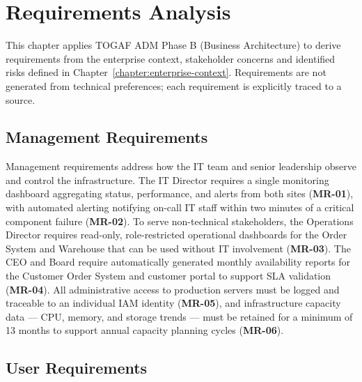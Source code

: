 \chapter{Requirements Analysis}
\label{chapter:requirements}

This chapter applies TOGAF ADM Phase B (Business Architecture) to derive requirements from the enterprise context, stakeholder concerns and identified risks defined in Chapter~\ref{chapter:enterprise-context}. Requirements are not generated from technical preferences; each requirement is explicitly traced to a source.

\section{Management Requirements}

\label{tab:req-mgmt}Management requirements address how the IT team and senior leadership observe and control the infrastructure. The IT Director requires a single monitoring dashboard aggregating status, performance, and alerts from both sites (\textbf{MR-01}), with automated alerting notifying on-call IT staff within two minutes of a critical component failure (\textbf{MR-02}). To serve non-technical stakeholders, the Operations Director requires read-only, role-restricted operational dashboards for the Order System and Warehouse that can be used without IT involvement (\textbf{MR-03}). The CEO and Board require automatically generated monthly availability reports for the Customer Order System and customer portal to support SLA validation (\textbf{MR-04}). All administrative access to production servers must be logged and traceable to an individual IAM identity (\textbf{MR-05}), and infrastructure capacity data --- CPU, memory, and storage trends --- must be retained for a minimum of 13 months to support annual capacity planning cycles (\textbf{MR-06}).

\section{User Requirements}

